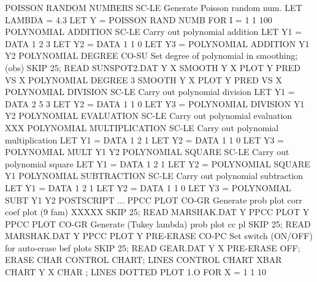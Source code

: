 POISSON RANDOM NUMBERS      SC-LE Generate Poisson random num.
                                  LET LAMBDA = 4.3
                                  LET Y = POISSON RAND NUMB FOR I = 1 1 100
POLYNOMIAL ADDITION         SC-LE Carry out polynomial addition
                                  LET Y1 = DATA 1 2 3
                                  LET Y2 = DATA 1 1 0
                                  LET Y3 = POLYNOMIAL ADDITION Y1 Y2
POLYNOMIAL DEGREE           CO-SU Set degree of polynomial in smoothing; (obs)
                                  SKIP 25; READ SUNSPOT2.DAT Y X
                                  SMOOTH Y X
                                  PLOT Y PRED VS X
                                  POLYNOMIAL DEGREE 3
                                  SMOOTH Y X
                                  PLOT Y PRED VS X
POLYNOMIAL DIVISION         SC-LE Carry out polynomial division
                                  LET Y1 = DATA 2 5 3
                                  LET Y2 = DATA 1 1 0
                                  LET Y3 = POLYNOMIAL DIVISION Y1 Y2
POLYNOMIAL EVALUATION       SC-LE Carry out polynomial evaluation
XXX
POLYNOMIAL MULTIPLICATION   SC-LE Carry out polynomial multiplication
                                  LET Y1 = DATA 1 2 1
                                  LET Y2 = DATA 1 1 0
                                  LET Y3 = POLYNOMIAL MULT Y1 Y2
POLYNOMIAL SQUARE           SC-LE Carry out polynomial square
                                  LET Y1 = DATA 1 2 1
                                  LET Y2 = POLYNOMIAL SQUARE Y1
POLYNOMIAL SUBTRACTION      SC-LE Carry out polynomial subtraction
                                  LET Y1 = DATA 1 2 1
                                  LET Y2 = DATA 1 1 0
                                  LET Y3 = POLYNOMIAL SUBT Y1 Y2
POSTSCRIPT
... PPCC PLOT               CO-GR Generate prob plot corr coef plot (9 fam)
XXXXX
                                  SKIP 25; READ MARSHAK.DAT Y
                                  PPCC PLOT Y
PPCC PLOT                   CO-GR Generate (Tukey lambda) prob plot cc pl
                                  SKIP 25; READ MARSHAK.DAT Y
                                  PPCC PLOT Y
PRE-ERASE                   CO-PC Set switch (ON/OFF) for auto-erase bef plots
                                  SKIP 25; READ GEAR.DAT Y X
                                  PRE-ERASE OFF; ERASE
                                  CHAR CONTROL CHART; LINES CONTROL CHART
                                  XBAR CHART Y X
                                  CHAR ; LINES DOTTED
                                  PLOT 1.O FOR X = 1 1 10
